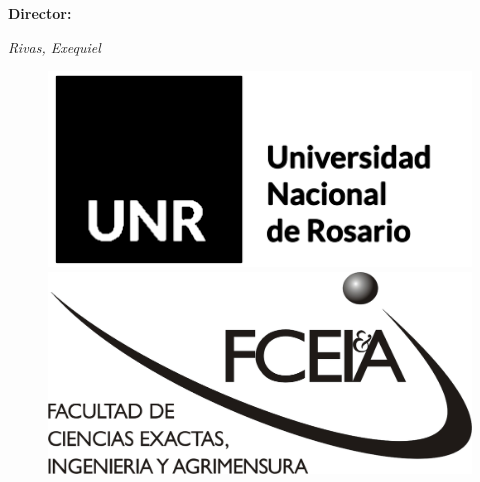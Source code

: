 \begin{titlepage}
	
	
	\vspace{2\baselineskip} %

        \Large{\textbf{Director:}}
	
	
    {\itshape\LARGE Rivas, Exequiel}

	\vspace*{6\baselineskip} %
    
    \begin{figure}[h] %
	\centering
	\includegraphics[width=0.4\linewidth]{img/UNR.png} \hfill \includegraphics[width=0.4\linewidth]{img/FCEIA.jpeg}
	\end{figure}
    
    \vfill %
	
		
	\vspace{0.2\baselineskip} %
	
	

\end{titlepage}


